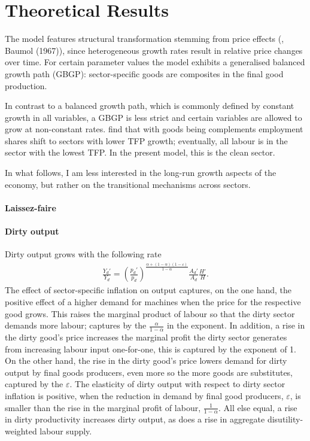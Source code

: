 \section{Theoretical Results}\label{sec:theory}
 The model features structural transformation stemming from price effects (\cite{Ngai2007StructuralGrowth}, Baumol (1967)), since heterogeneous growth rates result in relative price changes over time. %
For certain parameter values the model exhibits a generalised balanced growth path (GBGP): sector-specific goods are composites in the final good production.

In contrast to a balanced growth path, which is commonly defined by constant growth in all variables, a GBGP is less strict and certain variables are allowed to grow at non-constant rates. 
\cite{Ngai2007StructuralGrowth} find that with goods being complements employment shares shift to sectors with lower TFP growth; eventually, all labour is in the sector with the lowest TFP. In the present model, this is the clean sector. 

In what follows, I am less interested in the long-run growth aspects of the economy, but rather on the transitional mechanisms across sectors. 


\paragraph{Laissez-faire}
\paragraph{Dirty output}

Dirty output grows with the following rate
\begin{align*}
	\frac{Y_d'}{Y_d}=\left(\frac{p_d'}{p_d}\right)^{\frac{\alpha+(1-\alpha)(1-\varepsilon)}{1-\alpha}}\frac{A_d'}{A_d}\frac{H'}{H}.
\end{align*}
The effect of sector-specific inflation on output captures, on the one hand, the positive effect of a higher demand for machines when the price for the respective good grows. This raises the marginal product of labour so that the dirty sector demands more labour; captures by the $\frac{\alpha}{1-\alpha}$ in the exponent. In addition,  a rise in the dirty good's price increases the marginal profit the dirty sector generates from increasing labour input one-for-one, this is captured by the exponent of 1. On the other hand,  the rise in the dirty good's price lowers demand for dirty output by final goods producers, even more so the more goods are substitutes, captured by the $\varepsilon$. The elasticity of dirty output with respect to dirty sector inflation is positive, when the reduction in demand by final good producers, $\varepsilon$,  is smaller than the rise in the marginal profit of labour, $\frac{1}{1-\alpha}$. 
All else equal, a rise in dirty productivity increases dirty output, as does a rise in aggregate disutility-weighted labour supply.

